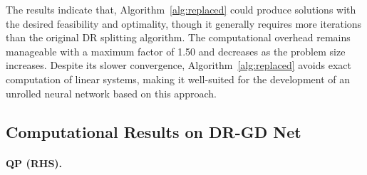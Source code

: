 \documentclass[10pt]{article} %
\begin{document}
The results indicate that, Algorithm~\ref{alg:replaced} could produce solutions with the desired feasibility and optimality, though it generally requires more iterations than the original DR splitting algorithm. 
The computational overhead remains manageable with a maximum factor of 1.50 and decreases as the problem size increases. 
Despite its slower convergence, Algorithm~\ref{alg:replaced} avoids exact computation of linear systems, making it well-suited for the development of an unrolled neural network based on this approach.

\begin{table}[ht]
	\centering
        \caption{Convergence comparison between Algorithm~\ref{alg:dr} and Algorithm~\ref{alg:replaced}}
	\label{tab:dr_replaced}
\end{table}

\subsection{Computational Results on DR-GD Net}


\paragraph{QP (RHS).}
\end{document}
